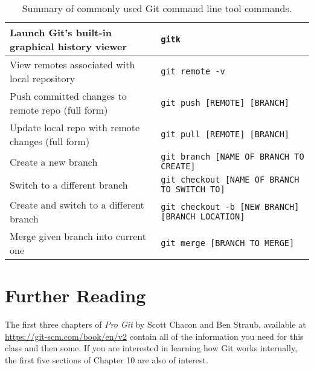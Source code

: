 \begin{table}[htbp!]
\begin{tabular}{l|l}
         Launch Git's built-in graphical history viewer & \texttt{gitk} \\ \hline
         View remotes associated with local repository & \texttt{git remote -v} \\
         Push committed changes to remote repo (full form) & \texttt{git push [REMOTE] [BRANCH]} \\
         Update local repo with remote changes (full form) & \texttt{git pull [REMOTE] [BRANCH]} \\ \hline
         Create a new branch & \texttt{git branch [NAME OF BRANCH TO CREATE]} \\
         Switch to a different branch & \texttt{git checkout [NAME OF BRANCH TO SWITCH TO]} \\
         Create and switch to a different branch & \texttt{git checkout -b [NEW BRANCH] [BRANCH LOCATION]} \\ \hline
         Merge given branch into current one & \texttt{git merge [BRANCH TO MERGE]} \\ \hline
    \end{tabular}
    \caption{Summary of commonly used Git command line tool commands.}
    \label{gitCommandsFull.tab}
\end{table}

\section{Further Reading}

The first three chapters of \emph{Pro Git} by Scott Chacon and Ben Straub,
available at
\href{https://git-scm.com/book/en/v2}{https://git-scm.com/book/en/v2} contain
all of the information you need for this class and then some.  If you are
interested in learning how Git works internally, the first five sections of
Chapter 10 are also of interest.
